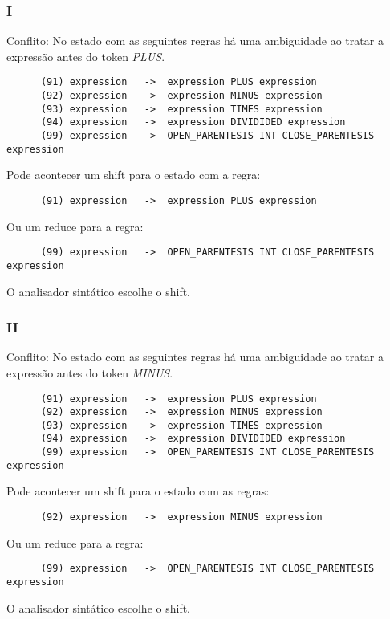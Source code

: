 \documentclass[a4paper,10pt]{article}
\begin{document}
      \subsubsection{I}
      Conflito: No estado com as seguintes regras h\'a uma ambiguidade ao tratar a express\~ao antes do token \emph{PLUS}.
      \begin{lstlisting}
      (91) expression	->	expression PLUS expression
      (92) expression	->	expression MINUS expression
      (93) expression	->	expression TIMES expression
      (94) expression	->	expression DIVIDIDED expression
      (99) expression	->	OPEN_PARENTESIS INT CLOSE_PARENTESIS expression
      \end{lstlisting}
      Pode acontecer um shift para o estado com a regra:
      \begin{lstlisting}
      (91) expression	->	expression PLUS expression
      \end{lstlisting}
      Ou um reduce para a regra:
      \begin{lstlisting}
      (99) expression	->	OPEN_PARENTESIS INT CLOSE_PARENTESIS expression
      \end{lstlisting}
      O analisador sint\'atico escolhe o shift.
      \vspace{5mm}
      
    \subsubsection{II}
      Conflito: No estado com as seguintes regras h\'a uma ambiguidade ao tratar a express\~ao antes do token \emph{MINUS}.
      \begin{lstlisting}
      (91) expression	->	expression PLUS expression
      (92) expression	->	expression MINUS expression
      (93) expression	->	expression TIMES expression
      (94) expression	->	expression DIVIDIDED expression
      (99) expression	->	OPEN_PARENTESIS INT CLOSE_PARENTESIS expression
      \end{lstlisting}
      Pode acontecer um shift para o estado com as regras:
      \begin{lstlisting}
      (92) expression	->	expression MINUS expression
      \end{lstlisting}
      Ou um reduce para a regra:
      \begin{lstlisting}
      (99) expression	->	OPEN_PARENTESIS INT CLOSE_PARENTESIS expression
      \end{lstlisting}
      O analisador sint\'atico escolhe o shift.
      \vspace{5mm}
\end{document}
